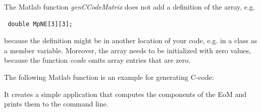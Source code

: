 The Matlab function \emph{genCCodeMatrix} does not add a definition of the array, e.g. 
\begin{lstlisting}
 double MpNE[3][3];
\end{lstlisting}
because the definition might be in another location of your code, e.g. in a class as a member variable.
Moreover, the array needs to be initialized with zero values, because the function \emph{ccode} omits array entries that are zero.


The following Matlab function is an example for generating C-code:


It creates a simple application that computes the components of the EoM and prints them to the command line.


